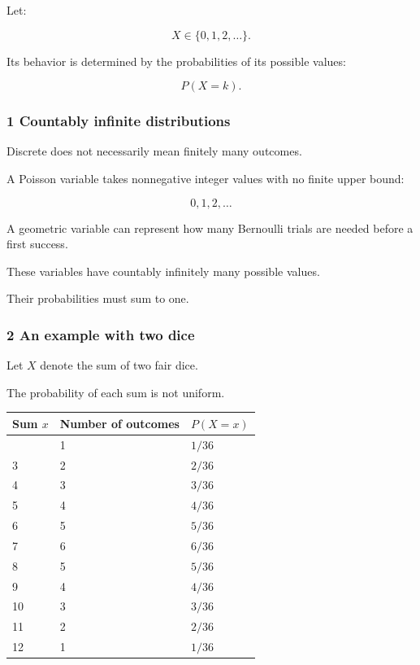 Let:

\[
 X\in\{0,1,2,\ldots\}.
\]

Its behavior is determined by the probabilities of its possible values:

\[
 P(X=k).
\]

\subsubsection{1 Countably infinite distributions}\label{02-foundations-ii-ch023-countably-infinite-distributions}

\hypertarget{02-foundations-ii-ch023-countably-infinite-distributions}{}

Discrete does not necessarily mean finitely many outcomes.

A Poisson variable takes nonnegative integer values with no finite upper bound:

\[
 0,1,2,\ldots
\]

A geometric variable can represent how many Bernoulli trials are needed before a first success.

These variables have countably infinitely many possible values.

Their probabilities must sum to one.

\subsubsection{2 An example with two dice}\label{02-foundations-ii-ch023-an-example-with-two-dice}

\hypertarget{02-foundations-ii-ch023-an-example-with-two-dice}{}

Let \(X\) denote the sum of two fair dice.

The probability of each sum is not uniform.

{\def\LTcaptype{none} %
\begin{longtable}[]{@{}lll@{}}
\toprule\noalign{}
Sum \(x\) & Number of outcomes & \(P(X=x)\) \\
\midrule\noalign{}
\endhead
\bottomrule\noalign{}
\endlastfoot
2 & 1 & \(1/36\) \\
3 & 2 & \(2/36\) \\
4 & 3 & \(3/36\) \\
5 & 4 & \(4/36\) \\
6 & 5 & \(5/36\) \\
7 & 6 & \(6/36\) \\
8 & 5 & \(5/36\) \\
9 & 4 & \(4/36\) \\
10 & 3 & \(3/36\) \\
11 & 2 & \(2/36\) \\
12 & 1 & \(1/36\) \\
\end{longtable}
}

